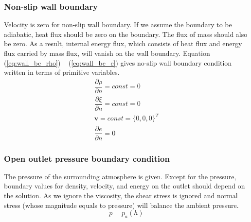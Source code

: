 \documentclass[journal abbreviation, manuscript]{copernicus}
\begin{document}
\subsubsection{Non-slip wall boundary}
Velocity is zero for non-slip wall boundary. If we assume the boundary to be adiabatic, heat flux should be zero on the boundary. The flux of mass should also be zero. As a result, internal energy flux, which consists of heat flux and energy flux carried by mass flux, will vanish on the wall boundary. Equation (\ref{eq:wall_bc_rho}) ~ (\ref{eq:wall_bc_e}) gives no-slip wall boundary condition written in terms of primitive variables.
\begin{align}
\dfrac{\partial \rho}{\partial n} = const = 0\label{eq:wall_bc_rho} \\
\dfrac{\partial \xi}{\partial n} = const = 0 \label{eq:wall_bc_xi}\\ 
\textbf{v} = const =\{0,0,0\}^T \label{eq:wall_bc_v}\\
\dfrac{\partial e }{\partial n} = 0\label{eq:wall_bc_e}
\end{align} 

\subsubsection{Open outlet pressure boundary condition}
The pressure of the surrounding atmosphere is given. Except for the pressure, boundary values for density, velocity, and energy on the outlet should depend on the solution. As we ignore the viscosity, the shear stress is ignored and normal stress (whose magnitude equals to pressure) will balance the ambient pressure.
\begin{equation}
p = p_a(h)\label{eq:pressure_bc_p} 
\end{equation} 
\end{document}
